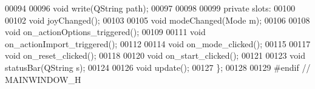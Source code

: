 \begin{DoxyCode}
00094     
00096     \textcolor{keywordtype}{void} write(QString path);
00097 
00098         
00099 \textcolor{keyword}{private} slots:
00100     
00102     \textcolor{keywordtype}{void} joyChanged();
00103     
00105     \textcolor{keywordtype}{void} modeChanged(Mode m);
00106     
00108     \textcolor{keywordtype}{void} on\_actionOptions\_triggered();
00109     
00111     \textcolor{keywordtype}{void} on\_actionImport\_triggered();
00112     
00114     \textcolor{keywordtype}{void} on\_mode\_clicked();
00115     
00117     \textcolor{keywordtype}{void} on\_reset\_clicked();
00118     
00120     \textcolor{keywordtype}{void} on\_start\_clicked();
00121     
00123     \textcolor{keywordtype}{void} statusBar(QString s);
00124     
00126     \textcolor{keywordtype}{void} update();
00127 \};
00128 
00129 \textcolor{preprocessor}{#endif // MAINWINDOW\_H}
\end{DoxyCode}
